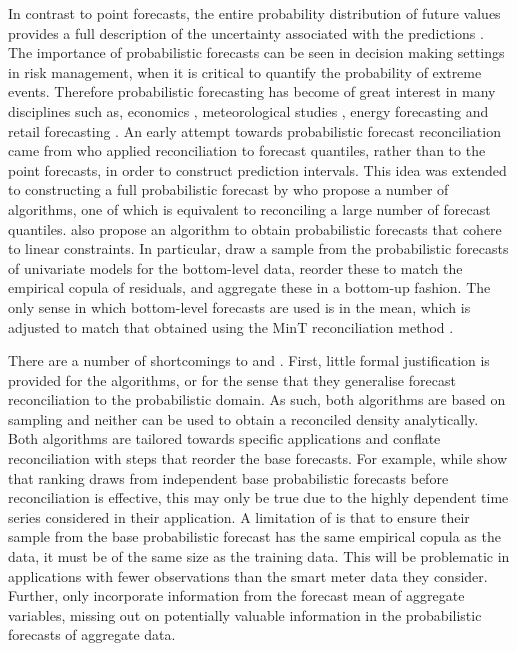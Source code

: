 \documentclass[a4paper,12pt]{article}
\theoremstyle{definition}
\begin{document}
In contrast to point forecasts, the entire probability distribution of future values provides a full description of the uncertainty associated with the predictions \citep{Gneiting2014}. The importance of probabilistic forecasts can be seen in decision making settings in risk management, when it is critical to quantify the probability of extreme events.  Therefore probabilistic forecasting has become of great interest in many disciplines such as, economics \citep{rossi2014}, meteorological studies \citep{mclean2013}, energy forecasting \citep{BenTaieb2017} and retail forecasting \citep{bose2017}.   An early attempt towards probabilistic forecast reconciliation came from \cite{ShaHyn2017} who applied reconciliation to forecast quantiles, rather than to the point forecasts, in order to construct prediction intervals. This idea was extended to constructing a full probabilistic forecast by \citet{JeoEtAl2019} who propose a number of algorithms, one of which is equivalent to reconciling a large number of forecast quantiles. \citet{Taieb2017} also propose an algorithm to obtain probabilistic forecasts that cohere to linear constraints. In particular, \citet{Taieb2017} draw a sample from the probabilistic forecasts of univariate models for the bottom-level data, reorder these to match the empirical copula of residuals, and aggregate these in a bottom-up fashion. The only sense in which bottom-level forecasts are used is in the mean, which is adjusted to match that obtained using the MinT reconciliation method \citep{WicEtAl2019}.

There are a number of shortcomings to \citet{JeoEtAl2019} and \citet{Taieb2017}. First, little formal justification is provided for the algorithms, or for the sense that they generalise forecast reconciliation to the probabilistic domain. As such, both algorithms are based on sampling and neither can be used to obtain a reconciled density analytically. Both algorithms are tailored towards specific applications and conflate reconciliation with steps that reorder the base forecasts. For example, while \citet{JeoEtAl2019} show that ranking draws from independent base probabilistic forecasts before reconciliation is effective, this may only be true due to the highly dependent time series considered in their application. A limitation of \citet{Taieb2017} is that to ensure their sample from the base probabilistic forecast has the same empirical copula as the data, it must be of the same size as the training data. This will be problematic in applications with fewer observations than the smart meter data they consider. Further, \citet{Taieb2017} only incorporate information from the forecast mean of aggregate variables, missing out on potentially valuable information in the probabilistic forecasts of aggregate data.
\end{document}
